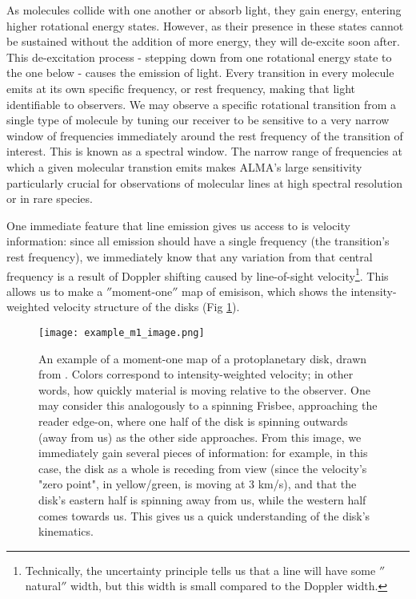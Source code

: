 As molecules collide with one another or absorb light, they gain energy, entering higher rotational energy states. However, as their presence in these states cannot be sustained without the addition of more energy, they will de-excite soon after. This de-excitation process - stepping down from one rotational energy state to the one below - causes the emission of light. Every transition in every molecule emits at its own specific frequency, or rest frequency, making that light identifiable to observers. We may observe a specific rotational transition from a single type of molecule by tuning our receiver to be sensitive to a very narrow window of frequencies immediately around the rest frequency of the transition of interest. This is known as a spectral window. The narrow range of frequencies at which a given molecular transtion emits makes ALMA's large sensitivity particularly crucial for observations of molecular lines at high spectral resolution or in rare species.

One immediate feature that line emission gives us access to is velocity information: since all emission should have a single frequency (the transition's rest frequency), we immediately know that any variation from that central frequency is a result of Doppler shifting caused by line-of-sight velocity\footnote{Technically, the uncertainty principle tells us that a line will have some $''$natural$''$ width, but this width is small compared to the Doppler width.}. This allows us to make a $''$moment-one$''$ map of emisison, which shows the intensity-weighted velocity structure of the disks (Fig \ref{fig:ex_mom1}).


\begin{figure} %
\centering
  \texttt{[image: example\_m1\_image.png]}
  \caption{An example of a moment-one map of a protoplanetary disk, drawn from \citet{Rosenfeld2012}. Colors correspond to intensity-weighted velocity; in other words, how quickly material is moving relative to the observer. One may consider this analogously to a spinning Frisbee, approaching the reader edge-on, where one half of the disk is spinning outwards (away from us) as the other side approaches. From this image, we immediately gain several pieces of information: for example, in this case, the disk as a whole is receding from view (since the velocity's "zero point", in yellow/green, is moving at 3 km/s), and that the disk's eastern half is spinning away from us, while the western half comes towards us. This gives us a quick understanding of the disk's kinematics.}
  \label{fig:ex_mom1}
\end{figure}


